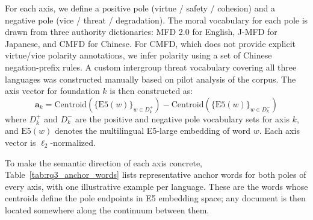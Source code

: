 \documentclass[../CLthesis.tex]{subfiles}
\begin{document}
For each axis, we define a positive pole (virtue / safety / cohesion) and a negative pole (vice / threat / degradation). The moral vocabulary for each pole is drawn from three authority dictionaries: MFD 2.0 \citep{frimer2025moral} for English, J-MFD \citep{matsuo2019development} for Japanese, and CMFD \citep{cheng_c-mfd_2023} for Chinese. For CMFD, which does not provide explicit virtue/vice polarity annotations, we infer polarity using a set of Chinese negation-prefix rules. A custom intergroup threat vocabulary covering all three languages was constructed manually based on pilot analysis of the corpus. The axis vector for foundation $k$ is then constructed as:
\begin{equation}
    \mathbf{a}_k = \text{Centroid}\!\left(\{\text{E5}(w)\}_{w \in D_k^+}\right) - \text{Centroid}\!\left(\{\text{E5}(w)\}_{w \in D_k^-}\right)
\end{equation}
where $D_k^+$ and $D_k^-$ are the positive and negative pole vocabulary sets for axis $k$, and $\text{E5}(w)$ denotes the multilingual E5-large embedding of word $w$. Each axis vector is $\ell_2$-normalized.

To make the semantic direction of each axis concrete, Table~\ref{tab:rq3_anchor_words} lists representative anchor words for both poles of every axis, with one illustrative example per language. These are the words whose centroids define the pole endpoints in E5 embedding space; any document is then located somewhere along the continuum between them.
\end{document}
